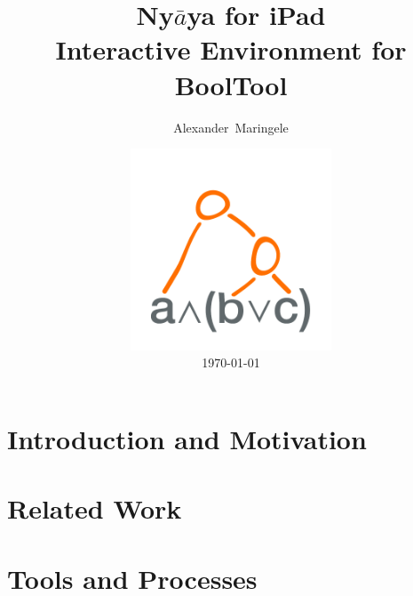 \documentclass{clbthesis}
\begin{document}
\nocite{*}

\title{Ny$\bar{a}$ya for iPad\vspace{0.5cm}\\ \LARGE{Interactive Environment for BoolTool}}
\author{Alexander~Maringele}
\date{\includegraphics[width=6cm]{pics/NyayaAppIcon1024.png}\\ \today}


\maketitle

\abstract{}

\tableofcontents
\chapter{Introduction and Motivation} 			


\chapter{Related Work}						


\chapter{Tools and Processes}					

\end{document}
